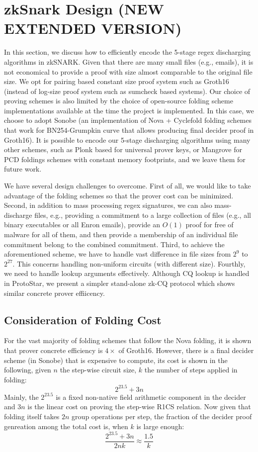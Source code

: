 \section{zkSnark Design {\bf (NEW EXTENDED VERSION)}}
In this section, we discuss how to efficiently encode the
5-stage regex discharging algorithms in zkSNARK. Given that
there are many small files (e.g., emails), it is not economical
to provide a proof with size almost comparable to the original
file size. We opt for pairing based constant size proof system
such as Groth16 (instead of log-size proof system such as sumcheck
based systems). Our choice of proving schemes is also limited
by the choice of open-source folding scheme implementations available
at the time the project is implemented.
In this case, we choose to adopt Sonobe (an implementation of
Nova + Cyclefold folding schemes that work for BN254-Grumpkin curve
that allows producing final decider proof in Groth16). 
It is possible to encode our 5-stage discharging algorithms using
many other schemes, such as Plonk based for universal prover keys,
or Mangrove for PCD foldings schemes with constant memory footprints,
and we leave them for future work.

We have several design challenges to overcome.
First of all, we would like to take advantage of
the folding schemes so that the prover cost can be
minimized. Second, in addition to mass processing regex signatures,
we can also mass-discharge files, e.g., providing
a commitment to a large collection of files (e.g., all binary executables
or all Enron emails), provide an $O(1)$ proof for free of
malware for all of them, and then provide a membership 
of an individual file commitment belong to the combined commitment.
Third, to achieve the aforementioned scheme, we have to
handle vast difference in file sizes from $2^{9}$ to $2^{27}$.
This concerns handling non-uniform circuits (with different size).
Fourthly, we need to handle lookup arguments effectively.
Although CQ lookup is handled in ProtoStar, we present
a simpler stand-alone zk-CQ protocol which shows similar
concrete prover effiicency.

\subsection{Consideration of Folding Cost}
For the vast majority of folding schemes that follow the Nova folding,
it is shown that prover concrete efficiency is $4\times$ of Groth16.
However, there is a final decider scheme (in Sonobe) that is expensive
to compute, its cost is shown in the following, given $n$ the step-wise
circuit size, $k$ the number of steps applied in folding: 
\[
	2^{23.5} + 3n
\]
Mainly, the $2^{23.5}$ is a fixed non-native field arithmetic component in the decider and $3n$ is the linear cost on proving the step-wise R1CS relation.
Now given that folding itself takes $2n$ group operations per step, the fraction of the decider proof genreation among the total cost is, when $k$ is large enough:
\[
\frac{2^{23.5} + 3n}{2nk} \approx \frac{1.5}{k}
\]

